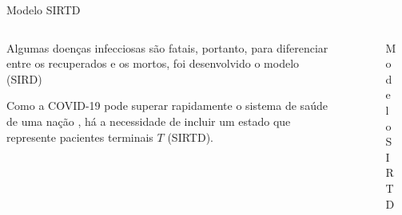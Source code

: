 \documentclass[aspectratio=169]{beamer}                    %
\begin{document}
\begin{frame}{Modelo SIRTD}
    \begin{columns}
        \begin{column}{0.5\textwidth}
            \begin{vfilleditems}
                \item Algumas doenças infecciosas são fatais, portanto, para diferenciar entre os recuperados e os mortos, foi desenvolvido o modelo (SIRD) \parencite{bailey1975mathematical}
                \item Como a COVID-19 pode superar rapidamente o sistema de saúde de uma nação \parencite{pintonetoMathematicalModelCOVID192021}, há a necessidade de incluir um estado que represente pacientes terminais $T$ (SIRTD).
            \end{vfilleditems}
        \end{column}
        \begin{column}{0.5\textwidth}
            \begin{figure}
                \centering
                \label{fig:SIRTD}
                \caption{Modelo SIRTD}
            \end{figure}
        \end{column}
\end{columns}
\end{frame}
\end{document}

